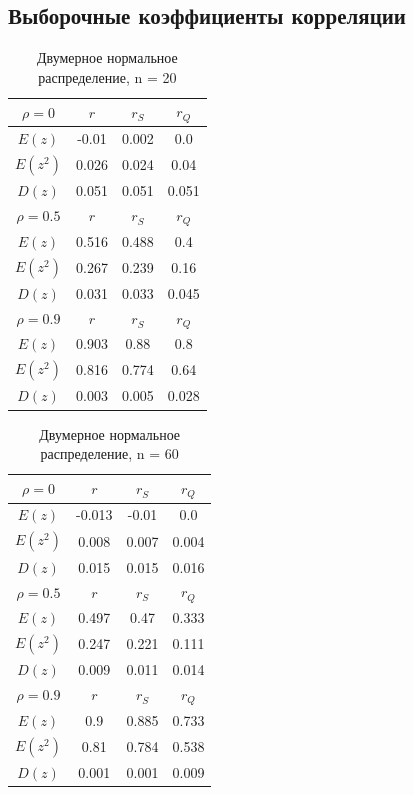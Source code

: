 \subsection{Выборочные коэффициенты корреляции}
	\begin{table}[H]
		\centering
		\begin{tabular}{| c | c | c | c |}
			
			\hline
			$\rho=0$  & $r$      & $r_S$  & $r_Q$ \\
			\hline
			$E(z)$    & -0.01 & 0.002 & 0.0   \\
			$E(z^2)$  & 0.026 & 0.024 & 0.04  \\
			$D(z)$    & 0.051 & 0.051 & 0.051 \\
			\hline
			$\rho=0.5$ & $r$      & $r_S$  & $r_Q$ \\
			\hline
			$E(z)$    & 0.516 & 0.488 & 0.4   \\
			$E(z^2)$    & 0.267 & 0.239 & 0.16  \\
			$D(z)$      & 0.031 & 0.033 & 0.045 \\
			\hline
			$\rho=0.9$  & $r$      & $r_S$  & $r_Q$ \\
			\hline
			$E(z)$    & 0.903 & 0.88  & 0.8   \\
			$E(z^2)$    & 0.816 & 0.774 & 0.64  \\
			$D(z)$      & 0.003 & 0.005 & 0.028 \\
			\hline
			
		\end{tabular}{}
		\caption{Двумерное нормальное распределение, n = 20}
		\label{tab:n20}
	\end{table}
	
	
	\begin{table}[H]
		\centering
		\begin{tabular}{| c | c | c | c |}
			
			\hline
			$\rho = 0$ & $r$      & $r_S$  & $r_Q$ \\
			\hline
			$E(z)$    & -0.013 & -0.01 & 0.0   \\
			$E(z^2)$  & 0.008  & 0.007 & 0.004 \\
			$D(z)$    & 0.015  & 0.015 & 0.016 \\
			\hline
			$\rho = 0.5$ & $r$      & $r_S$  & $r_Q$ \\
			\hline
			$E(z)$    & 0.497 & 0.47  & 0.333 \\
			$E(z^2)$    & 0.247 & 0.221 & 0.111 \\
			$D(z)$      & 0.009 & 0.011 & 0.014 \\
			\hline
			$\rho = 0.9$ & $r$      & $r_S$  & $r_Q$ \\
			\hline
			$E(z)$    & 0.9   & 0.885 & 0.733 \\
			$E(z^2)$    & 0.81  & 0.784 & 0.538 \\
			$D(z)$      & 0.001 & 0.001 & 0.009 \\
			\hline
			
		\end{tabular}{}
		\caption{Двумерное нормальное распределение, n = 60}
		\label{tab:n60}
	\end{table}
	

